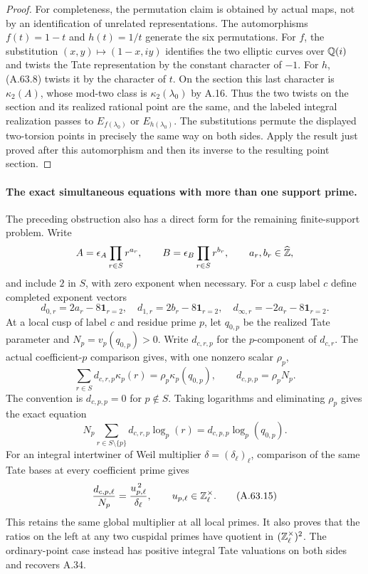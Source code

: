 \begin{proof}
For completeness, the permutation claim is obtained by
actual maps, not by an identification of unrelated
representations.  The automorphisms $f(t)=1-t$ and
$h(t)=1/t$ generate the six permutations.
For $f$, the substitution
$(x,y)\mapsto(1-x,iy)$ identifies the two elliptic curves
over $\mathbb Q(i)$ and twists the Tate representation by the
constant character of $-1$.
For $h$, (A.63.8) twists it by the character of $t$.
On the section this last character is $\kappa_2(A)$, whose
mod-two class is $\kappa_2(\lambda_0)$ by A.16.
Thus the two twists on the section and its realized rational
point are the same, and the labeled integral realization
passes to $E_{f(\lambda_0)}$ or $E_{h(\lambda_0)}$.
The substitutions permute the displayed two-torsion points
in precisely the same way on both sides.
Apply the result just proved after this automorphism and
then its inverse to the resulting point section.
\end{proof}

\paragraph{The exact simultaneous equations with more than one support prime.}
The preceding obstruction also has a direct form for the
remaining finite-support problem.  Write
\[
         A=\epsilon_A\prod_{r\in S}r^{a_r},\qquad
         B=\epsilon_B\prod_{r\in S}r^{b_r},
            \qquad a_r,b_r\in\widehat{\mathbb Z},
\]
and include $2$ in $S$, with zero exponent when necessary.
For a cusp label $c$ define completed exponent vectors
\[
 d_{0,r}=2a_r-8\mathbf1_{r=2},\quad
 d_{1,r}=2b_r-8\mathbf1_{r=2},\quad
 d_{\infty,r}=-2a_r-8\mathbf1_{r=2}.
\tag{A.63.12}
\]
At a local cusp of label $c$ and residue prime $p$, let
$q_{0,p}$ be the realized Tate parameter and
$N_p=v_p(q_{0,p})>0$.
Write $d_{c,r,p}$ for the $p$-component of $d_{c,r}$.
The actual coefficient-$p$ comparison gives, with one
nonzero scalar $\rho_p$,
\[
 \sum_{r\in S}d_{c,r,p}\kappa_p(r)
       =\rho_p\kappa_p(q_{0,p}),\qquad
 d_{c,p,p}=\rho_pN_p.
\tag{A.63.13}
\]
The convention is $d_{c,p,p}=0$ for $p\notin S$.
Taking logarithms and eliminating $\rho_p$ gives the exact
equation
\[
 N_p\sum_{r\in S\setminus\{p\}}
                d_{c,r,p}\log_p(r)
       =d_{c,p,p}\log_p(q_{0,p}).
\tag{A.63.14}
\]
For an integral intertwiner of Weil multiplier
$\delta=(\delta_\ell)_\ell$, comparison of the same Tate
bases at every coefficient prime gives
\[
       \frac{d_{c,p,\ell}}{N_p}
                    =\frac{u_{p,\ell}^{\,2}}{\delta_\ell},
                 \qquad u_{p,\ell}\in\mathbb Z_\ell^\times.
\tag{A.63.15}
\]
This retains the same global multiplier at all local primes.
It also proves that the ratios on the left at any two
cuspidal primes have quotient in
$(\mathbb Z_\ell^\times)^2$.  The ordinary-point case instead
has positive integral Tate valuations on both sides and
recovers A.34.

